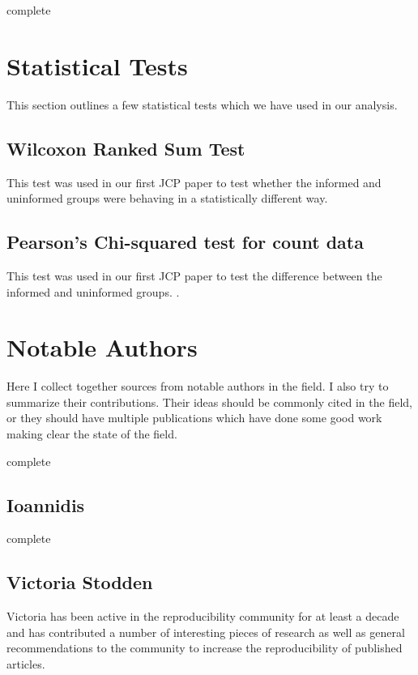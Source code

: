 \documentclass[american]{article}
\newcommand{\complete}{
	\gls{complete}
}
\begin{document}
\complete

\section{Statistical Tests} \label{sec:statistical}

This section outlines a few statistical tests which we have used in our analysis.

\subsection{Wilcoxon Ranked Sum Test} \label{sec:statistical-wilcoxon}

This test was used in our first JCP paper to test whether the informed and uninformed groups were behaving in a statistically different way. \cite{wilcoxon-test,R-wilcoxon-test}

\subsection{Pearson's Chi-squared test for count data} \label{sec:statistical-pearson-chisquare}

This test was used in our first JCP paper to test the difference between the informed and uninformed groups. \cite{pearson-chisquare,R-pearson-chisquare}.

\section{Notable Authors} \label{sec:authors}

Here I collect together sources from notable authors in the field. I also try to summarize their contributions. Their ideas should be commonly cited in the field, or they should have multiple publications which have done some good work making clear the state of the field.

\complete

\subsection{Ioannidis} \label{sec:authors-ioannidis}

\complete

\subsection{Victoria Stodden} \label{sec:authors-stodden}

Victoria has been active in the reproducibility community for at least a decade and has contributed a number of interesting pieces of research as well as general recommendations to the community to increase the reproducibility of published articles.
\end{document}
